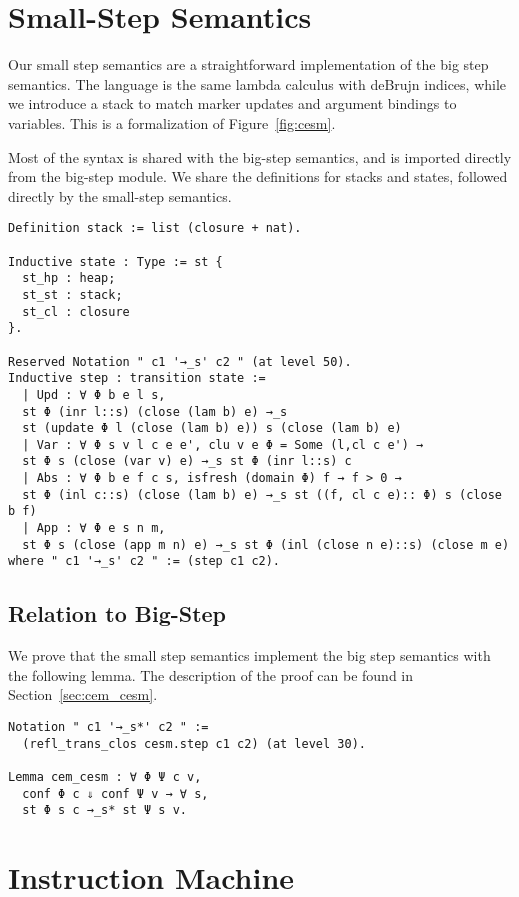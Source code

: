 \section{Small-Step \ce Semantics}

Our small step semantics are a straightforward implementation of the big step
semantics. The language is the same lambda calculus with deBrujn indices, while
we introduce a stack to match marker updates and argument bindings to variables.
This is a formalization of Figure~\ref{fig:cesm}. 

Most of the syntax is shared with the big-step semantics, and is imported
directly from the big-step module. We share the definitions for stacks and
states, followed directly by the small-step semantics.
\begin{verbatim}
Definition stack := list (closure + nat).

Inductive state : Type := st {
  st_hp : heap; 
  st_st : stack;
  st_cl : closure
}.

Reserved Notation " c1 '→_s' c2 " (at level 50).
Inductive step : transition state :=
  | Upd : ∀ Φ b e l s, 
  st Φ (inr l::s) (close (lam b) e) →_s 
  st (update Φ l (close (lam b) e)) s (close (lam b) e)
  | Var : ∀ Φ s v l c e e', clu v e Φ = Some (l,cl c e') → 
  st Φ s (close (var v) e) →_s st Φ (inr l::s) c
  | Abs : ∀ Φ b e f c s, isfresh (domain Φ) f → f > 0 → 
  st Φ (inl c::s) (close (lam b) e) →_s st ((f, cl c e):: Φ) s (close b f)
  | App : ∀ Φ e s n m, 
  st Φ s (close (app m n) e) →_s st Φ (inl (close n e)::s) (close m e)
where " c1 '→_s' c2 " := (step c1 c2).
\end{verbatim}

\subsection{Relation to Big-Step}

We prove that the small step semantics implement the big step semantics with the
following lemma. The description of the proof can be found in
Section~\ref{sec:cem_cesm}. 

\begin{verbatim}
Notation " c1 '→_s*' c2 " := 
  (refl_trans_clos cesm.step c1 c2) (at level 30). 

Lemma cem_cesm : ∀ Φ Ψ c v, 
  conf Φ c ⇓ conf Ψ v → ∀ s, 
  st Φ s c →_s* st Ψ s v. 
\end{verbatim}

\section{Instruction Machine} 

